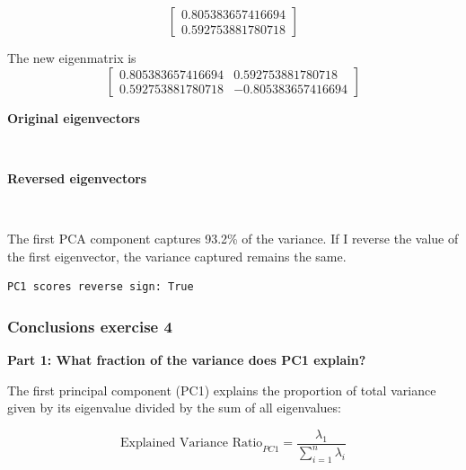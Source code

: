 \documentclass[11pt]{article}
\begin{document}
\[\left[\begin{matrix}0.805383657416694\\0.592753881780718\end{matrix}\right]\]

The new eigenmatrix is
\[\left[\begin{matrix}0.805383657416694 & 0.592753881780718\\0.592753881780718 & -0.805383657416694\end{matrix}\right]\]

    
    \textbf{Original eigenvectors}

    
    \begin{center}
    \end{center}
    { \hspace*{\fill} \\}
    
    \textbf{Reversed eigenvectors}

    
    \begin{center}
    \end{center}
    { \hspace*{\fill} \\}
    
    The first PCA component captures 93.2\% of the variance. If I reverse
the value of the first eigenvector, the variance captured remains the
same.

    
    \begin{Verbatim}[commandchars=\\\{\}]
PC1 scores reverse sign: True
    \end{Verbatim}


    \subsubsection{Conclusions exercise 4}\label{conclusions-exercise-4}

\textbf{Part 1: What fraction of the variance does PC1 explain?}

The first principal component (PC1) explains the proportion of total
variance given by its eigenvalue divided by the sum of all eigenvalues:

\[
\text{Explained Variance Ratio}_{PC1}
=
\frac{\lambda_1}{\sum_{i=1}^{n}\lambda_i}
\]
\end{document}
